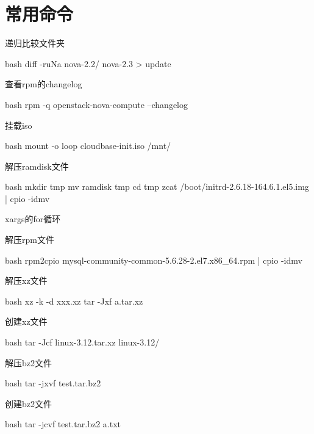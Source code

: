 \section{常用命令}
\begin{outline}[enumerate]
\1 递归比较文件夹
\begin{code-in-enumerate}{bash}
diff -ruNa nova-2.2/ nova-2.3 > update
\end{code-in-enumerate}

\1 查看rpm的changelog
\begin{code-in-enumerate}{bash}
rpm -q openstack-nova-compute --changelog
\end{code-in-enumerate}

\1 挂载iso
\begin{code-in-enumerate}{bash}
mount -o loop cloudbase-init.iso /mnt/
\end{code-in-enumerate}

\1 解压ramdisk文件
\begin{code-in-enumerate}{bash}
mkdir tmp
mv ramdisk tmp
cd tmp
zcat /boot/initrd-2.6.18-164.6.1.el5.img | cpio -idmv
\end{code-in-enumerate}

\1 xargs的for循环

\1 解压rpm文件
\begin{code-in-enumerate}{bash}
rpm2cpio mysql-community-common-5.6.28-2.el7.x86_64.rpm | cpio -idmv
\end{code-in-enumerate}

\1 解压xz文件
\begin{code-in-enumerate}{bash}
xz -k -d xxx.xz
tar -Jxf a.tar.xz
\end{code-in-enumerate}

\1 创建xz文件
\begin{code-in-enumerate}{bash}
tar -Jcf linux-3.12.tar.xz linux-3.12/
\end{code-in-enumerate}

\1 解压bz2文件
\begin{code-in-enumerate}{bash}
tar -jxvf test.tar.bz2
\end{code-in-enumerate}

\1 创建bz2文件
\begin{code-in-enumerate}{bash}
tar -jcvf test.tar.bz2 a.txt
\end{code-in-enumerate}


\end{outline}

